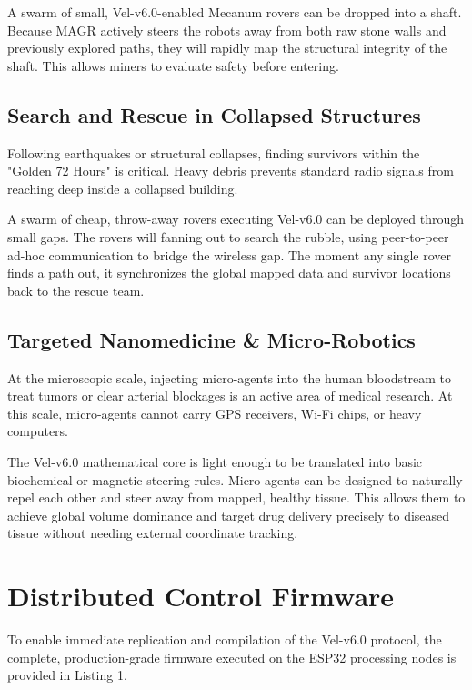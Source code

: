 \documentclass[letterpaper, 10pt, conference]{IEEEtran}
\begin{document}
A swarm of small, Vel-v6.0-enabled Mecanum rovers can be dropped into a shaft. Because MAGR actively steers the robots away from both raw stone walls and previously explored paths, they will rapidly map the structural integrity of the shaft. This allows miners to evaluate safety before entering.

\subsection{Search and Rescue in Collapsed Structures}
Following earthquakes or structural collapses, finding survivors within the "Golden 72 Hours" is critical. Heavy debris prevents standard radio signals from reaching deep inside a collapsed building.

A swarm of cheap, throw-away rovers executing Vel-v6.0 can be deployed through small gaps. The rovers will fanning out to search the rubble, using peer-to-peer ad-hoc communication to bridge the wireless gap. The moment any single rover finds a path out, it synchronizes the global mapped data and survivor locations back to the rescue team.

\subsection{Targeted Nanomedicine \& Micro-Robotics}
At the microscopic scale, injecting micro-agents into the human bloodstream to treat tumors or clear arterial blockages is an active area of medical research. At this scale, micro-agents cannot carry GPS receivers, Wi-Fi chips, or heavy computers.

The Vel-v6.0 mathematical core is light enough to be translated into basic biochemical or magnetic steering rules. Micro-agents can be designed to naturally repel each other and steer away from mapped, healthy tissue. This allows them to achieve global volume dominance and target drug delivery precisely to diseased tissue without needing external coordinate tracking.

\section{Distributed Control Firmware}
\label{sec:firmware}

To enable immediate replication and compilation of the Vel-v6.0 protocol, the complete, production-grade firmware executed on the ESP32 processing nodes is provided in Listing 1.
\end{document}
